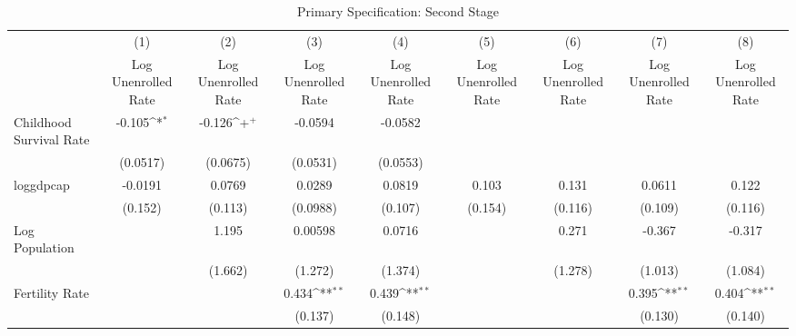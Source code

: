 \begin{table}[htbp]\centering
\def\sym#1{\ifmmode^{#1}\else\(^{#1}\)\fi}
\caption{Primary Specification: Second Stage}
\begin{tabular}{l*{8}{c}}
\toprule
                &\multicolumn{1}{c}{(1)}&\multicolumn{1}{c}{(2)}&\multicolumn{1}{c}{(3)}&\multicolumn{1}{c}{(4)}&\multicolumn{1}{c}{(5)}&\multicolumn{1}{c}{(6)}&\multicolumn{1}{c}{(7)}&\multicolumn{1}{c}{(8)}\\
                &\multicolumn{1}{c}{Log Unenrolled Rate}&\multicolumn{1}{c}{Log Unenrolled Rate}&\multicolumn{1}{c}{Log Unenrolled Rate}&\multicolumn{1}{c}{Log Unenrolled Rate}&\multicolumn{1}{c}{Log Unenrolled Rate}&\multicolumn{1}{c}{Log Unenrolled Rate}&\multicolumn{1}{c}{Log Unenrolled Rate}&\multicolumn{1}{c}{Log Unenrolled Rate}\\
\midrule
Childhood Survival Rate&   -0.105\sym{*}  &   -0.126\sym{+}  &  -0.0594         &  -0.0582         &                  &                  &                  &                  \\
                & (0.0517)         & (0.0675)         & (0.0531)         & (0.0553)         &                  &                  &                  &                  \\
\addlinespace
loggdpcap       &  -0.0191         &   0.0769         &   0.0289         &   0.0819         &    0.103         &    0.131         &   0.0611         &    0.122         \\
                &  (0.152)         &  (0.113)         & (0.0988)         &  (0.107)         &  (0.154)         &  (0.116)         &  (0.109)         &  (0.116)         \\
\addlinespace
Log Population  &                  &    1.195         &  0.00598         &   0.0716         &                  &    0.271         &   -0.367         &   -0.317         \\
                &                  &  (1.662)         &  (1.272)         &  (1.374)         &                  &  (1.278)         &  (1.013)         &  (1.084)         \\
\addlinespace
Fertility Rate  &                  &                  &    0.434\sym{**} &    0.439\sym{**} &                  &                  &    0.395\sym{**} &    0.404\sym{**} \\
                &                  &                  &  (0.137)         &  (0.148)         &                  &                  &  (0.130)         &  (0.140)         \\

\end{tabular}
\end{table}
